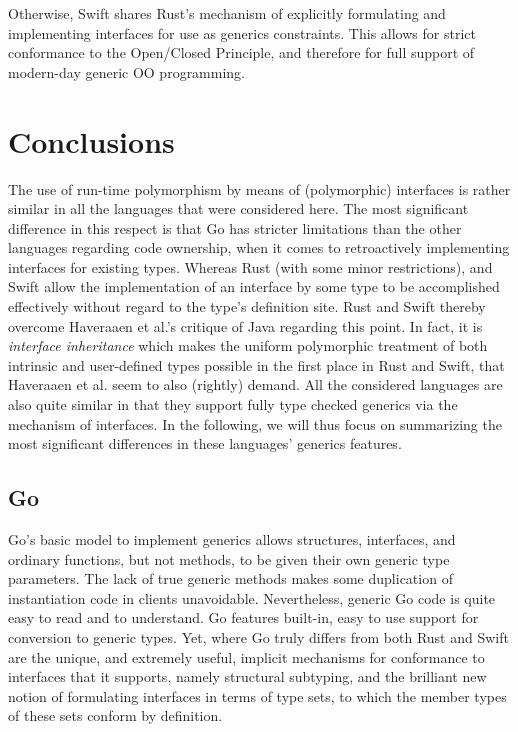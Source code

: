 \documentclass[11pt,oneside]{report}
\begin{document}
Otherwise, Swift shares Rust's mechanism of explicitly formulating and
implementing interfaces for use as generics constraints. This allows
for strict conformance to the Open/Closed Principle, and therefore for
full support of modern-day generic OO programming.


\section{Conclusions}

The use of run-time polymorphism by means of (polymorphic) interfaces
is rather similar in all the languages that were considered here. The
most significant difference in this respect is that Go has stricter
limitations than the other languages regarding code ownership, when it
comes to retroactively implementing interfaces for existing
types. Whereas Rust (with some minor restrictions), and Swift allow
the implementation of an interface by some type to be accomplished
effectively without regard to the type's definition site. Rust and
Swift thereby overcome Haveraaen et al.'s critique
\cite{Haveraaen_et_al_19} of Java regarding this point. In fact, it is
\emph{interface inheritance} which makes the uniform polymorphic
treatment of both intrinsic and user-defined types possible in the
first place in Rust and Swift, that Haveraaen et al. seem to also
(rightly) demand. All the considered languages are also quite similar
in that they support fully type checked generics via the mechanism of
interfaces. In the following, we will thus focus on summarizing the
most significant differences in these languages' generics features.

\subsection{Go}

Go's basic model to implement generics allows structures, interfaces,
and ordinary functions, but not methods, to be given their own generic
type parameters. The lack of true generic methods makes some
duplication of instantiation code in clients
unavoidable. Nevertheless, generic Go code is quite easy to read and
to understand. Go features built-in, easy to use support for
conversion to generic types. Yet, where Go truly differs from both
Rust and Swift are the unique, and extremely useful, implicit
mechanisms for conformance to interfaces that it supports, namely
structural subtyping, and the brilliant new notion of formulating
interfaces in terms of type sets, to which the member types of these
sets conform by definition.
\end{document}
